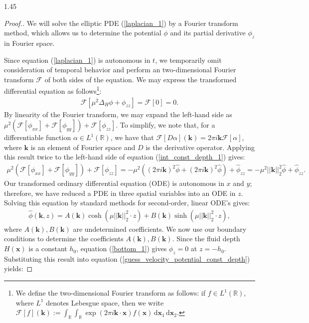 \documentclass[12pt,titlepage]{article}
\theoremstyle{definition}
\theoremstyle{remark}
\newcommand{\R}{\mathbb{R}}
\newcommand{\M}[1]{\mathbf{#1}}
\begin{document}
\begin{spacing}{1.45}
\begin{proof}[Proof.]
We will solve the elliptic PDE (\ref{laplacian_1}) by a Fourier transform method, which allows us to determine the potential $\phi$ and its partial derivative $\phi_z$ in Fourier space.

Since equation (\ref{laplacian_1}) is autonomous in $t$, we temporarily omit consideration of temporal behavior and perform an two-dimensional Fourier transform $\mathcal{F}$ of both sides of the equation. We may express the transformed differential equation as follows\footnote{We define the two-dimensional Fourier transform as follows: if $f \in L^1(\R)$, where $L^1$ denotes Lebesgue space, then we write $\mathcal{F}[f](\M{k}) := \int_{\R} \int_{\R} \exp(2 \pi i \M{k} \cdot \M{x}) f(\M{x}) \,  \mathrm{d}\M{x}_1 \, \mathrm{d}\M{x}_2$.}:
\begin{align}
\label{int_const_depth_1}
    \mathcal{F}[\mu^2 \Delta_H \phi + \phi_{zz}] = \mathcal{F}[0] = 0.
\end{align}
By linearity of the Fourier transform, we may expand the left-hand side as $\mu^2 (\mathcal{F}[\phi_{xx}] + \mathcal{F}[\phi_{yy}]) + \mathcal{F}[\phi_{zz}]$. To simplify, we note that, for a differentiable function $\alpha \in L^1(\R)$, we have that $\mathcal{F}[D \alpha](\M{k}) = 2 \pi i \M{k} \mathcal{F}[\alpha]$, where $\M{k}$ is an element of Fourier space and $D$ is the derivative operator. Applying this result twice to the left-hand side of equation (\ref{int_const_depth_1}) gives:
\begin{align*}
    \mu^2 (\mathcal{F}[\phi_{xx}] + \mathcal{F}[\phi_{yy}]) + \mathcal{F}[\phi_{zz}] = -\mu^2 \left(\left(2 \pi i \M{k} \right)^2 \hat{\phi} + \left(2 \pi i \M{k} \right) ^2  \hat{\phi} \right) + \hat{\phi}_{zz} = - \mu^2 ||\M{k}||_2^2  \hat{\phi} + \hat{\phi}_{zz}.
\end{align*}
Our transformed ordinary differential equation (ODE) is autonomous in $x$ and $y$; therefore, we have reduced a PDE in three spatial variables into an ODE in $z$. Solving this equation by standard methods for second-order, linear ODE's gives:
\begin{align}
\label{guess_velocity_potential_const_depth}
    \hat{\phi}(\M{k}, z) = A(\M{k}) \cosh(\mu ||\M{k}||_2^2 \cdot  z) + B(\M{k}) \sinh(\mu ||\M{k}||_2^2 \cdot  z),
\end{align}
where $A(\M{k}), B(\M{k})$ are undetermined coefficients. We now use our boundary conditions to determine the coefficients $A(\M{k}), B(\M{k})$. Since the fluid depth $H(\M{x})$ is a constant $h_0$, equation (\ref{bottom_1}) gives $\phi_z = 0$ at $z = -h_0$. Substituting this result into equation (\ref{guess_velocity_potential_const_depth}) yields:

\end{proof}
\end{spacing}
\end{document}
